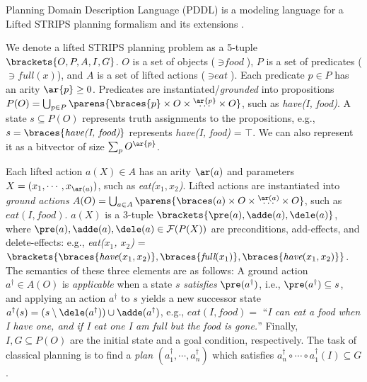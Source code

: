 Planning Domain Description Language (PDDL) is a modeling language for
a Lifted STRIPS planning formalism \citep{FikesHN72} and its extensions \citep{pddlbook}.

We denote a lifted STRIPS planning problem
as a 5-tuple $\brackets{O,P,A,I,G}$.
 $O$ is a set of objects ($\ni\textit{food}$),
 $P$ is a set of predicates ($\ni\textit{full}(x)$), and
 $A$ is a set of lifted actions ($\ni\textit{eat}$).
Each predicate $p\in P$ has an arity $\ar{p}\geq 0$.
Predicates are instantiated/\emph{grounded} into
propositions $P(O)=\bigcup_{p\in P} \parens{\braces{p}\times O\times\overset{\ar{p}}{\ldots}\times O}$,
such as \textit{have(I, food)}.
A state $s\subseteq P(O)$ represents truth assignments to the propositions,
e.g., $s=\braces{\textit{have(I, food)}}$ represents \textit{have(I, food)} = $\top$. %
We can also represent it as a bitvector of size $\sum_p O^{\ar{p}}$.

Each lifted action $a(X)\in A$ has an arity $\ar(a)$
and parameters $X=(x_1,\cdots,x_{\ar(a)})$, such as \textit{eat($x_1, x_2$)}.
Lifted actions are instantiated into 
\emph{ground actions} $A(O)=\bigcup_{a\in A} \parens{\braces(a)\times O\times\overset{\ar(a)}{\ldots}\times O}$,
such as $\textit{eat}(\textit{I},\textit{food})$.
$a(X)$ is a 3-tuple $\brackets{\pre(a),\adde(a),\dele(a)}$, where
 $\pre(a), \adde(a), \dele(a) \in \mathcal{F}(P(X))$ are
 preconditions, add-effects, and delete-effects:
e.g., \textit{eat($x_1$, $x_2$)} = $\brackets{\braces{\textit{have}(x_1, x_2)}, \braces{\textit{full}(x_1)}, \braces{\textit{have}(x_1,x_2)}}$.
The semantics of these three elements are as follows:
A ground action $a^{\dagger}\in A(O)$ is \emph{applicable} when a state $s$ \emph{satisfies} $\pre(a^{\dagger})$, i.e., $\pre(a^{\dagger})\subseteq s$,
and applying an action $a^{\dagger}$ to $s$ yields a new successor state
$a^{\dagger}(s) = (s \setminus \dele(a^{\dagger})) \cup \adde(a^{\dagger})$,
e.g., $\textit{eat}(\textit{I},\textit{food})=$ ``\emph{I can eat a food when I have one, and if I eat one I am full but the food is gone.}''
Finally,
$I,G\subseteq P(O)$ are the initial state and a goal condition, respectively.
The task of classical planning is to find a \emph{plan} $(a^{\dagger}_1,\cdots,a^{\dagger}_n)$
which satisfies $a^{\dagger}_n \circ \cdots \circ a^{\dagger}_1(I) \subseteq G$.
